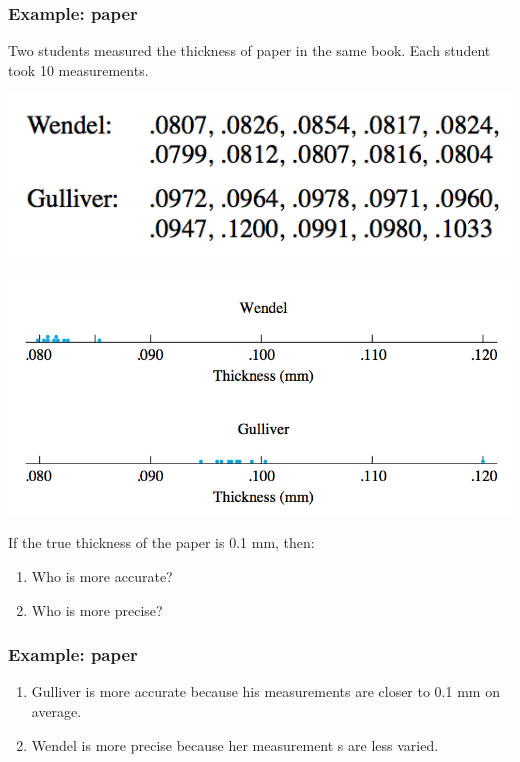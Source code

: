 \documentclass[handout]{beamer}
\providecommand{\q}{$\quad$ \newline}
\numberwithin{equation}{section}
\begin{document}
\begin{frame}
\frametitle{Example: paper} \scriptsize
Two students measured the thickness of paper in the same book. Each student took 10 measurements.

\begin{center}
 \includegraphics{../../fig/papertable.png} \q \includegraphics{../../fig/paperdot.png} 
\end{center}

\pause If the true thickness of the paper is 0.1 mm, then:

\begin{enumerate}
\item Who is more accurate?
\item Who is more precise?
\end{enumerate}
\end{frame}

\begin{frame}
\frametitle{Example: paper}

\begin{enumerate}[1. ]
\item Gulliver is more accurate because his measurements are closer to 0.1 mm on average.
\pause \item Wendel is more precise because her measurement s are less varied.
\end{enumerate}
\end{frame}
\end{document}
